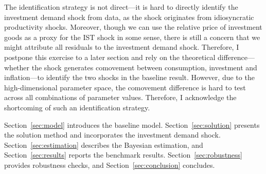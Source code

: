 The identification strategy is not direct---it is hard to directly identify the investment demand shock from data, as the shock originates from idiosyncratic productivity shocks. Moreover, though we can use the relative price of investment goods as a proxy for the IST shock in some sense, there is still a concern that we might attribute all residuals to the investment demand shock. Therefore, I postpone this exercise to a later section and rely on the theoretical difference---whether the shock generates comovement between consumption, investment and inflation---to identify the two shocks in the baseline result. However, due to the high-dimensional parameter space, the comovement difference is hard to test across all combinations of parameter values. Therefore, I acknowledge the shortcoming of such an identification strategy.

Section~\ref{sec:model} introduces the baseline model. Section~\ref{sec:solution} presents the solution method and incorporates the investment demand shock. Section~\ref{sec:estimation} describes the Bayesian estimation, and Section~\ref{sec:results} reports the benchmark results. Section~\ref{sec:robustness} provides robustness checks, and Section~\ref{sec:conclusion} concludes.